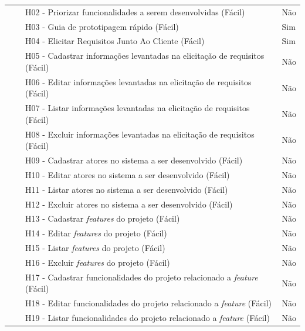 \begin{longtable}{|M{3.9cm}|M{2.6cm}|M{5.6cm}|M{2.6cm}|}
                                                                    &                      & H02 - Priorizar funcionalidades a serem desenvolvidas (Fácil)     & Não                  \\  
                                                                    &                      & H03 - Guia de prototipagem rápido (Fácil)                          & Sim                  \\  
                                                                    &                      & H04 - Elicitar Requisitos Junto Ao Cliente (Fácil)                 & Sim                  \\ 
&  & H05 - Cadastrar informações levantadas na elicitação de requisitos (Fácil) & Não \\                                 
&  & H06 - Editar informações levantadas na elicitação de requisitos (Fácil) & Não \\ 
&  & H07 - Listar informações levantadas na elicitação de requisitos (Fácil) & Não \\ 
&  & H08 - Excluir informações levantadas na elicitação de requisitos (Fácil) & Não \\ 
&  & H09 - Cadastrar atores no sistema a ser desenvolvido (Fácil) & Não \\ 
&  & H10 - Editar atores no sistema a ser desenvolvido (Fácil) & Não \\ 
&  & H11 - Listar atores no sistema a ser desenvolvido (Fácil) & Não \\ 
&  & H12 - Excluir atores no sistema a ser desenvolvido (Fácil) & Não \\ 
&  & H13 - Cadastrar \textit{features} do projeto (Fácil) & Não \\ 
&  & H14 - Editar \textit{features} do projeto (Fácil) & Não \\ 
&  & H15 - Listar \textit{features} do projeto (Fácil) & Não \\ 
&  & H16 - Excluir \textit{features} do projeto (Fácil) & Não \\ 
&  & H17 - Cadastrar funcionalidades do projeto relacionado a \textit{feature} (Fácil) & Não \\ 
&  & H18 - Editar funcionalidades do projeto relacionado a \textit{feature} (Fácil) & Não \\ 
&  & H19 - Listar funcionalidades do projeto relacionado a \textit{feature} (Fácil) & Não \\ 

\end{longtable}
